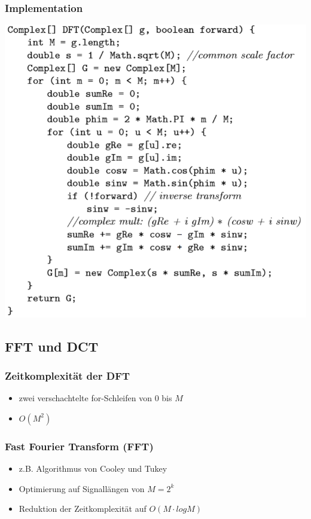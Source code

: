 \documentclass[10pt]{article}
\begin{document}
\subsubsection*{Implementation}
\begin{center}
	\includegraphics[scale=0.35]{dft-impl.png}
\end{center}

\subsection{FFT und DCT}
\subsubsection*{Zeitkomplexität der DFT}
\begin{itemize}
	\item zwei verschachtelte for-Schleifen von 0 bis $M$
	\item $O(M^2)$
\end{itemize}
\subsubsection*{Fast Fourier Transform (FFT)}
\begin{itemize}
	\item z.B. Algorithmus von Cooley und Tukey
	\item Optimierung auf Signallängen von $M=2^k$
	\item Reduktion der Zeitkomplexität auf $O(M \cdot log M)$
\end{itemize}
\end{document}
